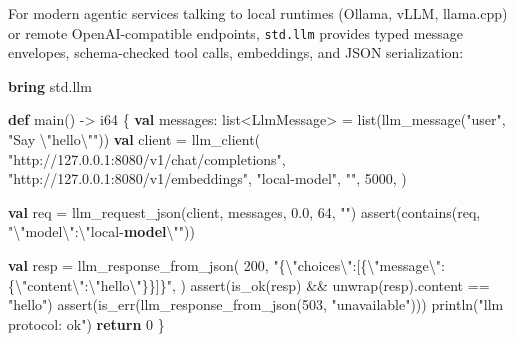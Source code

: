 \documentclass[
  english,
  oneside]{book}
\newenvironment{Shaded}{\begin{snugshade}}{\end{snugshade}}
\newcommand{\ControlFlowTok}[1]{\textcolor[rgb]{0.77,0.53,0.75}{\textbf{#1}}}
\newcommand{\DataTypeTok}[1]{\textcolor[rgb]{0.31,0.79,0.69}{#1}}
\newcommand{\DecValTok}[1]{\textcolor[rgb]{0.71,0.81,0.66}{#1}}
\newcommand{\FloatTok}[1]{\textcolor[rgb]{0.71,0.81,0.66}{#1}}
\newcommand{\FunctionTok}[1]{\textcolor[rgb]{0.86,0.86,0.67}{#1}}
\newcommand{\KeywordTok}[1]{\textcolor[rgb]{0.34,0.61,0.84}{\textbf{#1}}}
\newcommand{\NormalTok}[1]{\textcolor[rgb]{0.83,0.83,0.83}{#1}}
\newcommand{\OperatorTok}[1]{\textcolor[rgb]{0.83,0.83,0.83}{#1}}
\newcommand{\StringTok}[1]{\textcolor[rgb]{0.81,0.57,0.47}{#1}}
\begin{document}
For modern agentic services talking to local runtimes (Ollama, vLLM,
llama.cpp) or remote OpenAI-compatible endpoints, \texttt{std.llm}
provides typed message envelopes, schema-checked tool calls, embeddings,
and JSON serialization:

\begin{Shaded}
\begin{Highlighting}[]
\KeywordTok{bring}\NormalTok{ std}\OperatorTok{.}\NormalTok{llm}

\KeywordTok{def}\NormalTok{ main() }\OperatorTok{{-}\textgreater{}} \DataTypeTok{i64}\NormalTok{ \{}
    \KeywordTok{val}\NormalTok{ messages: }\DataTypeTok{list}\OperatorTok{\textless{}}\NormalTok{LlmMessage}\OperatorTok{\textgreater{}} \OperatorTok{=} \DataTypeTok{list}\NormalTok{(llm\_message(}\StringTok{"user"}\NormalTok{, }\StringTok{"Say \textbackslash{}"}\NormalTok{hello\textbackslash{}}\StringTok{""}\NormalTok{))}
    \KeywordTok{val}\NormalTok{ client }\OperatorTok{=}\NormalTok{ llm\_client(}
        \StringTok{"http://127.0.0.1:8080/v1/chat/completions"}\NormalTok{,}
        \StringTok{"http://127.0.0.1:8080/v1/embeddings"}\NormalTok{,}
        \StringTok{"local{-}model"}\NormalTok{,}
        \StringTok{""}\NormalTok{,}
        \DecValTok{5000}\NormalTok{,}
\NormalTok{    )}

    \KeywordTok{val}\NormalTok{ req }\OperatorTok{=}\NormalTok{ llm\_request\_json(client, messages, }\FloatTok{0.0}\NormalTok{, }\DecValTok{64}\NormalTok{, }\StringTok{""}\NormalTok{)}
    \FunctionTok{assert}\NormalTok{(}\FunctionTok{contains}\NormalTok{(req, }\StringTok{"\textbackslash{}"}\NormalTok{model\textbackslash{}}\StringTok{":\textbackslash{}"}\NormalTok{local}\OperatorTok{{-}}\KeywordTok{model}\NormalTok{\textbackslash{}}\StringTok{""}\NormalTok{))}

    \KeywordTok{val}\NormalTok{ resp }\OperatorTok{=}\NormalTok{ llm\_response\_from\_json(}
        \DecValTok{200}\NormalTok{,}
        \StringTok{"\{\textbackslash{}"}\NormalTok{choices\textbackslash{}}\StringTok{":[\{\textbackslash{}"}\NormalTok{message\textbackslash{}}\StringTok{":\{\textbackslash{}"}\NormalTok{content\textbackslash{}}\StringTok{":\textbackslash{}"}\NormalTok{hello\textbackslash{}}\StringTok{"\}\}]\}"}\NormalTok{,}
\NormalTok{    )}
    \FunctionTok{assert}\NormalTok{(}\FunctionTok{is\_ok}\NormalTok{(resp) }\OperatorTok{\&\&}\NormalTok{ unwrap(resp)}\OperatorTok{.}\NormalTok{content }\OperatorTok{==} \StringTok{"hello"}\NormalTok{)}
    \FunctionTok{assert}\NormalTok{(}\FunctionTok{is\_err}\NormalTok{(llm\_response\_from\_json(}\DecValTok{503}\NormalTok{, }\StringTok{"unavailable"}\NormalTok{)))}
\NormalTok{    println(}\StringTok{"llm protocol: ok"}\NormalTok{)}
    \ControlFlowTok{return} \DecValTok{0}
\NormalTok{\}}
\end{Highlighting}
\end{Shaded}
\end{document}

